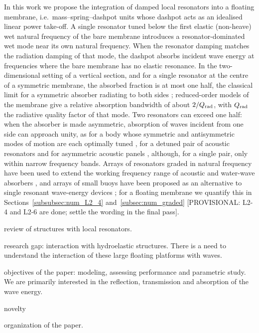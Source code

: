 \begin{itemize}
In this work we propose the integration of damped local resonators into a floating membrane, i.e.\ mass--spring--dashpot units whose dashpot acts as an idealised linear power take-off. A single resonator tuned below the first elastic (non-heave) wet natural frequency of the bare membrane introduces a resonator-dominated wet mode near its own natural frequency. When the resonator damping matches the radiation damping of that mode, the dashpot absorbs incident wave energy at frequencies where the bare membrane has no elastic resonance. In the two-dimensional setting of a vertical section, and for a single resonator at the centre of a symmetric membrane, the absorbed fraction is at most one half, the classical limit for a symmetric absorber radiating to both sides \cite{evans1976theory}; reduced-order models of the membrane give a relative absorption bandwidth of about $2/Q_{\rm rad}$, with $Q_{\rm rad}$ the radiative quality factor of that mode. Two resonators can exceed one half: when the absorber is made asymmetric, absorption of waves incident from one side can approach unity, as for a body whose symmetric and antisymmetric modes of motion are each optimally tuned \cite{evans1976theory}, for a detuned pair of acoustic resonators \cite{merkel2015control} and for asymmetric acoustic panels \cite{jimenez2017rainbow}, although, for a single pair, only within narrow frequency bands. Arrays of resonators graded in natural frequency have been used to extend the working frequency range of acoustic and water-wave absorbers \cite{jimenez2017rainbow,wilks2022rainbow,westcott2024broadband}, and arrays of small buoys have been proposed as an alternative to single resonant wave-energy devices \cite{garnaud2009wave}{\color{red}; for a floating membrane we quantify this in Sections~\ref{subsubsec:num_L2_4} and~\ref{subsec:num_graded} [PROVISIONAL: L2-4 and L2-6 are done; settle the wording in the final pass]}.
    
    {\color{red}\item review of structures with local resonators.}
    
    {\color{red}\item research gap: interaction with hydroelastic structures. There is a need to understand the interaction of these large floating platforms with waves.}
    
    {\color{red}\item objectives of the paper: modeling, assessing performance and parametric study. We are primarily interested in the reflection, transmission and absorption of the wave energy.}

    {\color{red} novelty}
    
    {\color{red}\item organization of the paper.}
\end{itemize}
